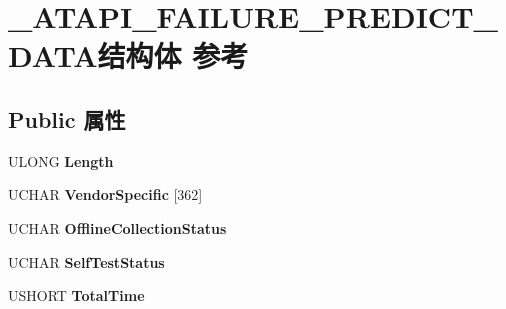 \hypertarget{struct___a_t_a_p_i___f_a_i_l_u_r_e___p_r_e_d_i_c_t___d_a_t_a}{}\section{\+\_\+\+A\+T\+A\+P\+I\+\_\+\+F\+A\+I\+L\+U\+R\+E\+\_\+\+P\+R\+E\+D\+I\+C\+T\+\_\+\+D\+A\+T\+A结构体 参考}
\label{struct___a_t_a_p_i___f_a_i_l_u_r_e___p_r_e_d_i_c_t___d_a_t_a}
\subsection*{Public 属性}
\begin{DoxyCompactItemize}
\item 
\mbox{\label{struct___a_t_a_p_i___f_a_i_l_u_r_e___p_r_e_d_i_c_t___d_a_t_a_a89085e7906788e428a706c70f57f6797}} 
U\+L\+O\+NG {\bfseries Length}
\item 
\mbox{\label{struct___a_t_a_p_i___f_a_i_l_u_r_e___p_r_e_d_i_c_t___d_a_t_a_a76d127da4b726de738b34ec8764b5b20}} 
U\+C\+H\+AR {\bfseries Vendor\+Specific} \mbox{[}362\mbox{]}
\item 
\mbox{\label{struct___a_t_a_p_i___f_a_i_l_u_r_e___p_r_e_d_i_c_t___d_a_t_a_a76a2c8432263a42edc48d30b287d3301}} 
U\+C\+H\+AR {\bfseries Offline\+Collection\+Status}
\item 
\mbox{\label{struct___a_t_a_p_i___f_a_i_l_u_r_e___p_r_e_d_i_c_t___d_a_t_a_afd69496c0788ecbbfaa92a1217fd4d95}} 
U\+C\+H\+AR {\bfseries Self\+Test\+Status}
\item 
\mbox{\label{struct___a_t_a_p_i___f_a_i_l_u_r_e___p_r_e_d_i_c_t___d_a_t_a_aee1da0311571985428d31382d8670190}} 
U\+S\+H\+O\+RT {\bfseries Total\+Time}
\item 
\mbox{\label{struct___a_t_a_p_i___f_a_i_l_u_r_e___p_r_e_d_i_c_t___d_a_t_a_ac8f5bc86d3986d98f7977b654bd64e6c}} 

\end{DoxyCompactItemize}
